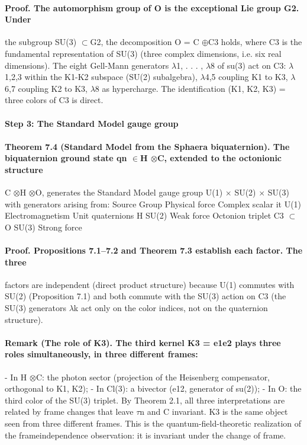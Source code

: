 \paragraph*{Proof. The automorphism group of O is the exceptional Lie group G2. Under}
the subgroup SU(3) $\subset$G2, the decomposition O = C $\oplus$C3 holds, where C3 is the fundamental representation of SU(3) (three complex dimensions, i.e. six real dimensions). The eight Gell-Mann generators $\lambda$1, . . . , $\lambda$8 of su(3) act on C3: $\lambda$1,2,3 within the K1-K2 subspace (SU(2) subalgebra), $\lambda$4,5 coupling K1 to K3, $\lambda$6,7 coupling K2 to K3, $\lambda$8 as hypercharge. The identification (K1, K2, K3) = three colors of C3 is direct.
\paragraph*{Step 3: The Standard Model gauge group}
\paragraph*{Theorem 7.4 (Standard Model from the Sphaera biquaternion). The biquaternion ground state qn $\in$H $\otimes$C, extended to the octonionic structure}
C $\otimes$H $\otimes$O, generates the Standard Model gauge group U(1) $\times$ SU(2) $\times$ SU(3) with generators arising from: Source Group Physical force Complex scalar it U(1) Electromagnetism Unit quaternions H SU(2) Weak force Octonion triplet C3 $\subset$O SU(3) Strong force
\paragraph*{Proof. Propositions 7.1--7.2 and Theorem 7.3 establish each factor. The three}
factors are independent (direct product structure) because U(1) commutes with SU(2) (Proposition 7.1) and both commute with the SU(3) action on C3 (the SU(3) generators $\lambda$k act only on the color indices, not on the quaternion structure).
\paragraph*{Remark (The role of K3). The third kernel K3 = e1e2 plays three roles simultaneously, in three different frames:}
- In H $\otimes$C: the photon sector (projection of the Heisenberg compensator,
orthogonal to K1, K2);
- In Cl(3): a bivector (e12, generator of su(2));
- In O: the third color of the SU(3) triplet.
By Theorem 2.1, all three interpretations are related by frame changes that leave $\tau$n and C invariant. K3 is the same object seen from three different frames. This is the quantum-field-theoretic realization of the frameindependence observation: it is invariant under the change of frame.

